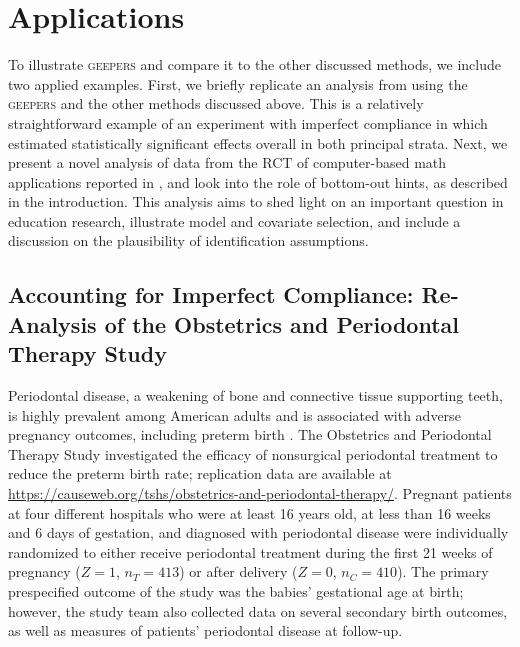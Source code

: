 \documentclass[]{article}
\begin{document}
\section{Applications}
To illustrate \textsc{geepers} and compare it to the other discussed methods, we include two applied examples.
First, we briefly replicate an analysis from \citet{richardson2023estimating} using the \textsc{geepers} and the other methods discussed above.
This is a relatively straightforward example of an experiment with imperfect compliance in which \citet{richardson2023estimating} estimated statistically significant effects overall in both principal strata.
Next, we present a novel analysis of data from the RCT of computer-based math applications reported in \citet{impactPaper}, and look into the role of bottom-out hints, as described in the introduction.
This analysis aims to shed light on an important question in education research, illustrate model and covariate selection, and include a discussion on the plausibility of identification assumptions. 

\subsection{Accounting for Imperfect Compliance: Re-Analysis of the Obstetrics and Periodontal Therapy Study}
\sloppy
Periodontal disease, a weakening of bone and connective tissue supporting teeth, is highly prevalent among American adults and is associated with adverse pregnancy outcomes, including preterm birth \citep{periodontalEpi}.
The Obstetrics and Periodontal Therapy Study \citep[(OPTS)][]{michalowicz2006treatment} investigated the efficacy of nonsurgical periodontal treatment to reduce the preterm birth rate; replication data are available at \url{https://causeweb.org/tshs/obstetrics-and-periodontal-therapy/}.
Pregnant patients at four different hospitals who were at least 16 years old, at less than 16 weeks and 6 days of gestation, and diagnosed with periodontal disease were individually randomized to either receive periodontal treatment during the first 21 weeks of pregnancy ($Z=1$, $n_T=413$) or after delivery ($Z=0$, $n_C=410$).
The primary prespecified outcome of the study was the babies' gestational age at birth; however, the study team also collected data on several secondary birth outcomes, as well as measures of patients' periodontal disease at follow-up.
\end{document}
